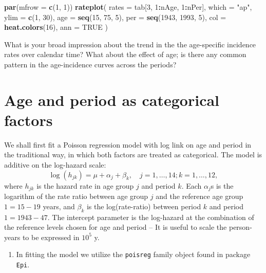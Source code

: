 \documentclass[
]{book}
\newenvironment{Shaded}{\begin{snugshade}}{\end{snugshade}}
\newcommand{\AttributeTok}[1]{\textcolor[rgb]{0.13,0.29,0.53}{#1}}
\newcommand{\ConstantTok}[1]{\textcolor[rgb]{0.56,0.35,0.01}{#1}}
\newcommand{\DecValTok}[1]{\textcolor[rgb]{0.00,0.00,0.81}{#1}}
\newcommand{\FunctionTok}[1]{\textcolor[rgb]{0.13,0.29,0.53}{\textbf{#1}}}
\newcommand{\NormalTok}[1]{#1}
\newcommand{\SpecialCharTok}[1]{\textcolor[rgb]{0.81,0.36,0.00}{\textbf{#1}}}
\newcommand{\StringTok}[1]{\textcolor[rgb]{0.31,0.60,0.02}{#1}}
\providecommand{\tightlist}{%
  \setlength{\itemsep}{0pt}\setlength{\parskip}{0pt}}
\begin{document}
\begin{Shaded}
\begin{Highlighting}[]
\FunctionTok{par}\NormalTok{(}\AttributeTok{mfrow =} \FunctionTok{c}\NormalTok{(}\DecValTok{1}\NormalTok{, }\DecValTok{1}\NormalTok{))}
\FunctionTok{rateplot}\NormalTok{(}
  \AttributeTok{rates =}\NormalTok{ tab[}\DecValTok{3}\NormalTok{, }\DecValTok{1}\SpecialCharTok{:}\NormalTok{nAge, }\DecValTok{1}\SpecialCharTok{:}\NormalTok{nPer], }\AttributeTok{which =} \StringTok{"ap"}\NormalTok{, }\AttributeTok{ylim =} \FunctionTok{c}\NormalTok{(}\DecValTok{1}\NormalTok{, }\DecValTok{30}\NormalTok{),}
  \AttributeTok{age =} \FunctionTok{seq}\NormalTok{(}\DecValTok{15}\NormalTok{, }\DecValTok{75}\NormalTok{, }\DecValTok{5}\NormalTok{), }\AttributeTok{per =} \FunctionTok{seq}\NormalTok{(}\DecValTok{1943}\NormalTok{, }\DecValTok{1993}\NormalTok{, }\DecValTok{5}\NormalTok{),}
  \AttributeTok{col =} \FunctionTok{heat.colors}\NormalTok{(}\DecValTok{16}\NormalTok{), }\AttributeTok{ann =} \ConstantTok{TRUE}
\NormalTok{)}
\end{Highlighting}
\end{Shaded}

What is your broad impression about the trend in the the age-specific
incidence rates over calendar time? What about the effect of age; is
there any common pattern in the age-incidence curves across the periods?

\section{Age and period as categorical factors}\label{age-and-period-as-categorical-factors}

We shall first fit a Poisson regression model with log link on age and
period in the traditional way, in which both factors are treated as
categorical. The model is additive on the log-hazard scale:
\[ \log(h_{jk}) = \mu + \alpha_j + \beta_k, \quad j=1, \dots, 14; k=1, \dots, 12, \]
where \(h_{jk}\) is the hazard rate in age group \(j\) and period \(k\). Each
\(\alpha_j\)s is the logarithm of the rate ratio between age group \(j\) and
the reference age group \(1 = 15-19\) years, and \(\beta_k\) is the
log(rate-ratio) between period \(k\) and period \(1 = 1943-47\). The
intercept parameter is the log-hazard at the combination of the
reference levels chosen for age and period -- It is useful to scale the
person-years to be expressed in \(10^5\) y.

\begin{enumerate}
\def\labelenumi{\arabic{enumi}.}
\tightlist
\item
  In fitting the model we utilize the \texttt{poisreg} family object found in
  package \texttt{Epi}.
\end{enumerate}
\end{document}
